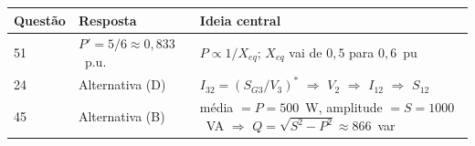 \documentclass[a4paper,11pt]{article}
\numberwithin{equation}{section}
\numberwithin{figure}{section}
\numberwithin{table}{section}
\begin{document}
\begin{table}[H]
  \centering
  \begin{tabular}{@{}ll>{\raggedright\arraybackslash}p{7.6cm}@{}}
    \toprule
    Questão & Resposta & Ideia central \\
    \midrule
    51 & $P' = 5/6 \approx 0{,}833$~p.u. &
      $P \propto 1/X_{eq}$; $X_{eq}$ vai de $0{,}5$ para $0{,}6$~pu \\
    24 & Alternativa (D) &
      $I_{32} = (S_{G3}/V_3)^{*}$ $\Rightarrow$ $V_2$ $\Rightarrow$
      $I_{12}$ $\Rightarrow$ $S_{12}$ \\
    45 & Alternativa (B) &
      média $= P = 500$~W, amplitude $= S = 1000$~VA
      $\Rightarrow$ $Q = \sqrt{S^2 - P^2} \approx 866$~var \\
    \bottomrule
  \end{tabular}
\end{table}

\printbibliography[heading=bibintoc,title={Referências}]
\end{document}
